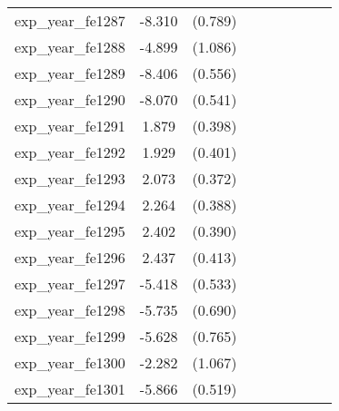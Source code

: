 {\begin{tabular}{l*{4}{cc}}
exp\_year\_fe1287&   -8.310\sym{***}&  (0.789)&                  &         &                  &         &                  &         \\
exp\_year\_fe1288&   -4.899\sym{***}&  (1.086)&                  &         &                  &         &                  &         \\
exp\_year\_fe1289&   -8.406\sym{***}&  (0.556)&                  &         &                  &         &                  &         \\
exp\_year\_fe1290&   -8.070\sym{***}&  (0.541)&                  &         &                  &         &                  &         \\
exp\_year\_fe1291&    1.879\sym{***}&  (0.398)&                  &         &                  &         &                  &         \\
exp\_year\_fe1292&    1.929\sym{***}&  (0.401)&                  &         &                  &         &                  &         \\
exp\_year\_fe1293&    2.073\sym{***}&  (0.372)&                  &         &                  &         &                  &         \\
exp\_year\_fe1294&    2.264\sym{***}&  (0.388)&                  &         &                  &         &                  &         \\
exp\_year\_fe1295&    2.402\sym{***}&  (0.390)&                  &         &                  &         &                  &         \\
exp\_year\_fe1296&    2.437\sym{***}&  (0.413)&                  &         &                  &         &                  &         \\
exp\_year\_fe1297&   -5.418\sym{***}&  (0.533)&                  &         &                  &         &                  &         \\
exp\_year\_fe1298&   -5.735\sym{***}&  (0.690)&                  &         &                  &         &                  &         \\
exp\_year\_fe1299&   -5.628\sym{***}&  (0.765)&                  &         &                  &         &                  &         \\
exp\_year\_fe1300&   -2.282\sym{*}  &  (1.067)&                  &         &                  &         &                  &         \\
exp\_year\_fe1301&   -5.866\sym{***}&  (0.519)&                  &         &                  &         &                  &         \\

\end{tabular}}
